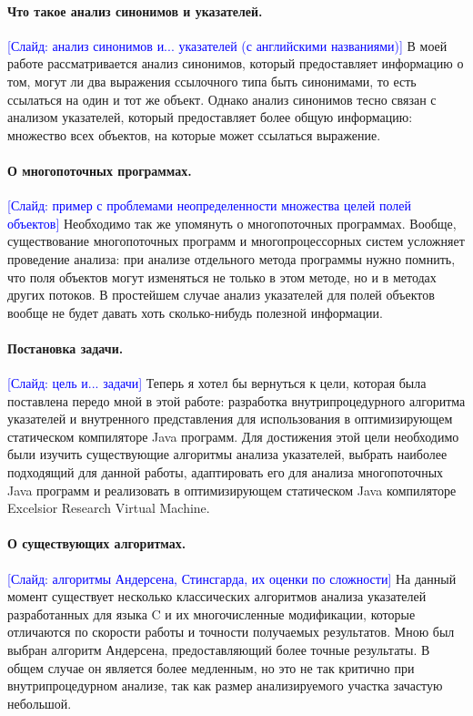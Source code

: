 \documentclass[12pt]{article}
\newcommand{\slide}[1]{\textcolor{Blue}{[Слайд: #1]}}
\newcommand{\eng}[1]{{\English#1}}
\begin{document}
  \paragraph{Что такое анализ синонимов и указателей.}
  \slide{анализ синонимов и... указателей (с английскими названиями)}
  В моей работе рассматривается анализ синонимов, который предоставляет
  информацию о том, могут ли два выражения ссылочного типа быть синонимами, то
  есть ссылаться на один и тот же объект. Однако анализ синонимов тесно связан
  с анализом указателей, который предоставляет более общую информацию:
  множество всех объектов, на которые может ссылаться выражение.

  \paragraph{О многопоточных программах.}
  \slide{пример с проблемами неопределенности множества целей полей объектов}
  Необходимо так же упомянуть о многопоточных программах. Вообще,
  существование многопоточных программ и многопроцессорных систем усложняет
  проведение анализа: при анализе отдельного метода программы нужно помнить,
  что поля объектов могут изменяться не только в этом методе, но и в методах
  других потоков. В простейшем случае анализ указателей для полей объектов
  вообще не будет давать хоть сколько-нибудь полезной информации.

  \paragraph{Постановка задачи.}
  \slide{цель и... задачи}
  Теперь я хотел бы вернуться к цели, которая была поставлена передо мной в
  этой работе: разработка внутрипроцедурного алгоритма указателей и внутренного
  представления для использования в оптимизирующем статическом компиляторе Java
  программ. Для достижения этой цели необходимо были изучить существующие
  алгоритмы анализа указателей, выбрать наиболее подходящий для данной работы,
  адаптировать его для анализа многопоточных Java программ и реализовать в
  оптимизирующем статическом Java компиляторе \eng{Excelsior Research Virtual
  Machine}.

  \paragraph{О существующих алгоритмах.}
  \slide{алгоритмы Андерсена, Стинс\-гар\-да, их оценки по сложности}
  На данный момент существует несколько классических алгоритмов анализа
  указателей разработанных для языка C и их многочисленные модификации, которые
  отличаются по скорости работы и точности получаемых результатов. Мною был
  выбран алгоритм Андерсена, предоставляющий более точные результаты. В общем
  случае он является более медленным, но это не так критично при
  внутрипроцедурном анализе, так как размер анализируемого участка зачастую
  небольшой.
\end{document}
